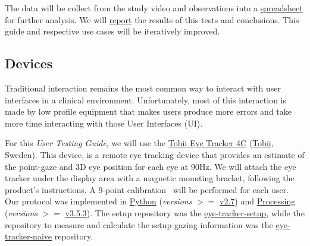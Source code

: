 The data will be collect from the study video and observations into a \hyperlink{https://docs.google.com/spreadsheets/d/1CoPLONnINdBWryGs7SBRuPZA-DnQ0t_yzx3u8ym0UoI/edit?usp=sharing}{spreadsheet} for further analysis. We will \hyperlink{https://github.com/mida-project/research-reports}{report} the results of this tests and conclusions. This guide and respective use cases will be iteratively improved.


























\subsection{Devices}

Traditional interaction remains the most common way to interact with user interfaces in a clinical environment. Unfortunately, most of this interaction is made by low profile equipment that makes users produce more errors and take more time interacting with those User Interfaces (UI).

For this \textit{User Testing Guide}, we will use the \hyperlink{https://gaming.tobii.com/product/tobii-eye-tracker-4c/}{Tobii Eye Tracker 4C} (\hyperlink{https://www.tobii.com/}{Tobii}, Sweden). This device, is a remote eye tracking device that provides an estimate of the point-gaze and 3D eye position for each eye at 90Hz. We will attach the eye tracker under the display area with a magnetic mounting bracket, following the product's instructions. A 9-point calibration~\cite{chatelain2018evaluation} will be performed for each user. Our protocol was implemented in \hyperlink{https://www.python.org/}{Python} (\textit{versions} $>=$ \hyperlink{https://docs.python.org/2/}{v2.7}) and \hyperlink{http://www.processing.org/}{Processing} (\textit{versions} $>=$ \hyperlink{https://github.com/processing/processing/releases/tag/processing-0269-3.5.3}{v3.5.3}). The setup repository was the \hyperlink{https://github.com/mida-project/eye-tracker-setup}{eye-tracker-setup}, while the repository to measure and calculate the setup gazing information was the \hyperlink{https://github.com/mida-project/eye-tracker-naive}{eye-tracker-naive} repository.

